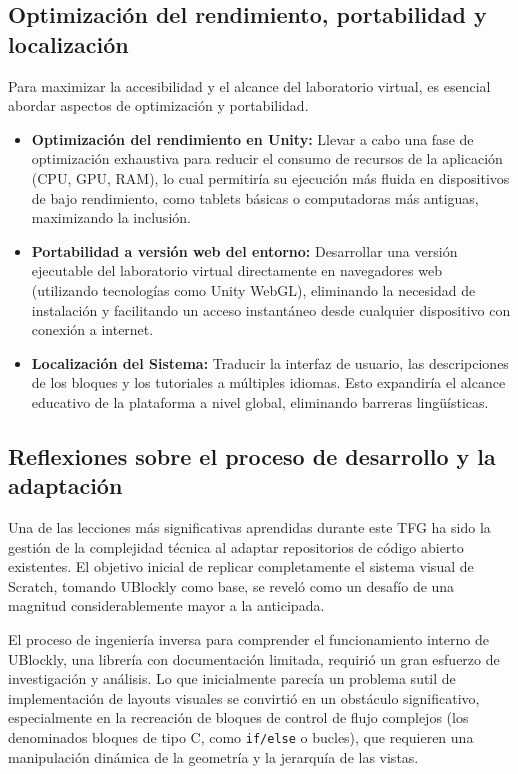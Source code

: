 \subsection{Optimización del rendimiento, portabilidad y localización}
Para maximizar la accesibilidad y el alcance del laboratorio virtual, es esencial abordar aspectos de optimización y portabilidad.
\begin{itemize}
	\item \textbf{Optimización del rendimiento en Unity:} Llevar a cabo una fase de optimización exhaustiva para reducir el consumo de recursos de la aplicación (CPU, GPU, RAM), lo cual permitiría su ejecución más fluida en dispositivos de bajo rendimiento, como tablets básicas o computadoras más antiguas, maximizando la inclusión.
	\item \textbf{Portabilidad a versión web del entorno:} Desarrollar una versión ejecutable del laboratorio virtual directamente en navegadores web (utilizando tecnologías como Unity WebGL), eliminando la necesidad de instalación y facilitando un acceso instantáneo desde cualquier dispositivo con conexión a internet.
	\item \textbf{Localización del Sistema:} Traducir la interfaz de usuario, las descripciones de los bloques y los tutoriales a múltiples idiomas. Esto expandiría el alcance educativo de la plataforma a nivel global, eliminando barreras lingüísticas.
\end{itemize}


\subsection{Reflexiones sobre el proceso de desarrollo y la adaptación}
Una de las lecciones más significativas aprendidas durante este TFG ha sido la gestión de la complejidad técnica al adaptar repositorios de código abierto existentes. El objetivo inicial de replicar completamente el sistema visual de Scratch, tomando UBlockly como base, se reveló como un desafío de una magnitud considerablemente mayor a la anticipada.

El proceso de ingeniería inversa para comprender el funcionamiento interno de UBlockly, una librería con documentación limitada, requirió un gran esfuerzo de investigación y análisis. Lo que inicialmente parecía un problema sutil de implementación de layouts visuales se convirtió en un obstáculo significativo, especialmente en la recreación de bloques de control de flujo complejos (los denominados bloques de tipo C, como \texttt{if/else} o bucles), que requieren una manipulación dinámica de la geometría y la jerarquía de las vistas.

